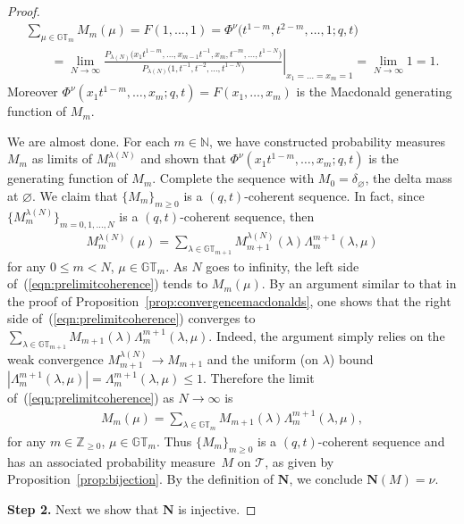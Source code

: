 \documentclass[pdftex]{sigma}
\numberwithin{equation}{section}
\newcommand{\Z}{\mathbb{Z}}
\newcommand{\N}{\mathbb{N}}
\newcommand{\GT}{\mathbb{GT}}
\newcommand{\Tau}{\mathcal{T}}
\newcommand{\NN}{\mathbf{N}}
\begin{document}
\begin{proof}
\begin{gather*}
\sum_{\mu\in\GT_m}{M_m(\mu)} = F(1, \dots, 1) = \Phi^{\nu}\big(t^{1-m}, t^{2-m}, \dots, 1; q, t\big)\\
\qquad{} = \lim_{N\rightarrow\infty}{ \left.\frac{P_{\lambda(N)}\big( x_1t^{1-m}, \dots, x_{m-1}t^{-1}, x_m, t^{-m}, \dots, t^{1 - N}\big)}{P_{\lambda(N)}\big(1, t^{-1}, t^{-2}, \dots, t^{1 - N}\big)}\right|_{x_1 = \dots = x_m = 1} } = \lim_{N\rightarrow\infty}{ 1 } = 1.
\end{gather*}
Moreover $\Phi^{\nu}(x_1t^{1-m}, \dots, x_m; q, t) = F(x_1, \dots, x_m)$ is the Macdonald generating function of $M_m$.

We are almost done. For each $m\in\N$, we have constructed probability measures $M_m$ as limits of $M^{\lambda(N)}_m$ and shown that $\Phi^{\nu}(x_1t^{1-m}, \dots, x_m; q, t)$ is the generating function of $M_m$. Complete the sequence with $M_0 = \delta_{\varnothing}$, the delta mass at $\varnothing$. We claim that $\{M_m\}_{m\geq 0}$ is a $(q, t)$-coherent sequence. In fact, since $\{M_m^{\lambda(N)}\}_{m = 0, 1, \dots, N}$ is a $(q, t)$-coherent sequence, then
\begin{gather}\label{eqn:prelimitcoherence}
M_m^{\lambda(N)}(\mu) = \sum_{\lambda\in\GT_{m+1}}{ M_{m+1}^{\lambda(N)}(\lambda)\Lambda^{m+1}_m(\lambda, \mu) }
\end{gather}
for any $0\leq m < N$, $\mu\in\GT_m$.
As $N$ goes to inf\/inity, the left side of~(\ref{eqn:prelimitcoherence}) tends to $M_m(\mu)$.
By an argument similar to that in the proof of Proposition~\ref{prop:convergencemacdonalds}, one shows that the right side of~(\ref{eqn:prelimitcoherence}) converges to $\sum\limits_{\lambda\in\GT_{m+1}} M_{m+1}(\lambda) \Lambda^{m+1}_m(\lambda, \mu)$.
Indeed, the argument simply relies on the weak convergence $M_{m+1}^{\lambda(N)} \rightarrow M_{m+1}$ and the uniform (on $\lambda$) bound $|\Lambda^{m+1}_m(\lambda, \mu)| = \Lambda^{m+1}_m(\lambda, \mu) \leq 1$.
Therefore the limit of~(\ref{eqn:prelimitcoherence}) as $N\rightarrow\infty$ is
\begin{gather*}
M_m(\mu) = \sum_{\lambda\in\GT_m}{ M_{m+1}(\lambda)\Lambda^{m+1}_m(\lambda, \mu) },
\end{gather*}
for any $m\in\Z_{\geq 0}$, $\mu\in\GT_m$. Thus $\{M_m\}_{m\geq 0}$ is a $(q, t)$-coherent sequence and has an associated probability measure~$M$ on $\Tau$, as given by Proposition~\ref{prop:bijection}. By the def\/inition of $\NN$, we conclude $\NN(M) = \nu$.


\textbf{Step 2.} Next we show that $\NN$ is injective.


\end{proof}
\end{document}
